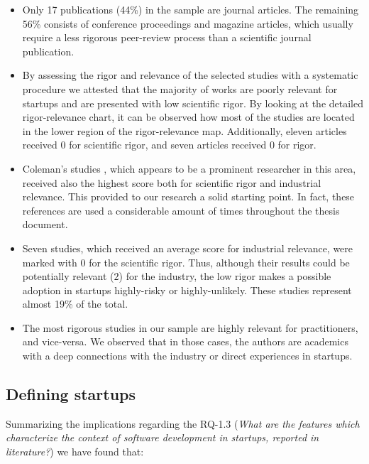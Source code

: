\documentclass[final,5p,times,twocolumn]{elsarticle}
\begin{document}
\begin{itemize}

\item Only 17 publications (44\%) in the sample are journal articles. The remaining 56\% consists of conference proceedings and magazine articles, which usually require a less rigorous peer-review process than a scientific journal publication.
\item By assessing the rigor and relevance of the selected studies with a systematic procedure we attested that the majority of works are poorly relevant for startups and are presented with low scientific rigor. By looking at the detailed rigor-relevance chart, it can be observed how most of the studies are located in the lower region of the rigor-relevance map. Additionally, eleven articles received 0 for scientific rigor, and seven articles received 0 for rigor.
\item Coleman’s studies \cite{Coleman2008,Coleman2008a,Coleman2007}, which appears to be a prominent researcher in this area, received also the highest score both for scientific rigor and industrial relevance. This provided to our research a solid starting point. In fact, these references are used a considerable amount of times throughout the thesis document.
\item Seven studies, which received an average score for industrial relevance, were marked with $0$ for the scientific rigor. Thus, although their results could be potentially relevant ($2$) for the industry, the low rigor makes a possible adoption in startups  highly-risky or highly-unlikely. These studies represent almost 19\% of the total.
\item The most rigorous studies in our sample are highly relevant for practitioners, and vice-versa. We observed that in those cases, the authors are academics with a deep connections with the industry or direct experiences in startups.
\end{itemize}


\subsection{Defining startups} %
\label{sub:defining_startups}

Summarizing the implications regarding the RQ-1.3 (\textit{What are the features which characterize the context of software development in startups, reported in literature?}) we have found that:
\end{document}
